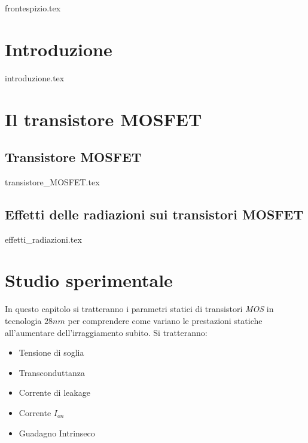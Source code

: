\documentclass[
	a4paper,
	cleardoublepage=empty,
	headings=twolinechapter,
	numbers=autoenddot,
]{scrbook}
\begin{document}
\frontmatter

{frontespizio.tex}

\tableofcontents
\listoffigures

\listoftables 
\mainmatter

\chapter*{Introduzione}
{introduzione.tex}

\chapter{Il transistore MOSFET}
\section{Transistore MOSFET}
{transistore_MOSFET.tex}

\section{Effetti delle radiazioni sui transistori MOSFET}
{effetti_radiazioni.tex}


\chapter{Studio sperimentale}
In questo capitolo si tratteranno i parametri statici di transistori \emph{MOS} in tecnologia $28 nm$ per comprendere come variano le prestazioni statiche all'aumentare dell'irraggiamento subito. Si tratteranno:
\begin{itemize}
  \item Tensione di soglia
  \item Transconduttanza
  \item Corrente di leakage
  \item Corrente $I_{on}$
  \item Guadagno Intrinseco
\end{itemize}
\end{document}
